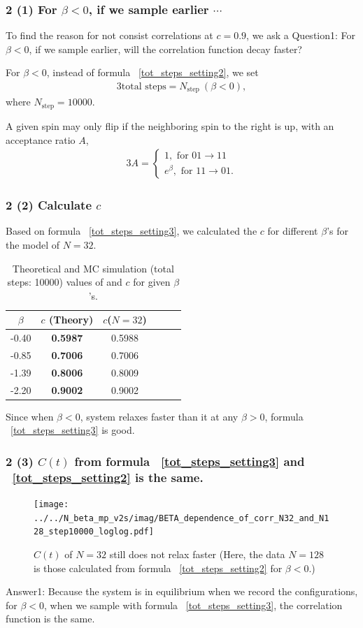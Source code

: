 \documentclass[8pt]{beamer}
\begin{document}
\begin{frame}
	\frametitle{2 (1) For $\beta < 0$, if we sample earlier $\cdots$}
	To find the reason for not consist correlations at $c=0.9$, we ask a Question1:
	For $\beta < 0$, if we sample earlier, will the correlation function decay faster? 
	
	For $\beta < 0$,
	instead of formula ~\ref{tot_steps_setting2}, we set 
	\begin{alignat}{3}
		\text{total steps} = N_\text{step} \   (\beta < 0)\label{tot_steps_setting3},
	\end{alignat}
	where $N_\text{step}=10000$.
	
	A given spin may only flip if the neighboring spin to the right is up, with an acceptance ratio $A$,
	\begin{alignat}{3}
		A = \left\{
		\begin{aligned}
			1, \text{ for } 01 \to 11 \\
			e^{\beta}, \text{ for } 11 \to 01.
		\end{aligned}
		\right
		.\nonumber
	\end{alignat}
\end{frame}
\begin{frame}
	\frametitle{2 (2) Calculate $c$}
	Based on formula ~\ref{tot_steps_setting3}, we calculated the $c$ for different $\beta$'s for the model of $N=32$.
	\begin{table}[htbp]
		\centering
		\caption{\label{tab:table_lino3} Theoretical and MC simulation (total steps: 10000) values of and $c$ for given $\beta$'s.}
		\begin{tabular}{cccccc}
			$\beta$ & $c$ (Theory) & $c$($N=32$) \\
			\hline
			-0.40 & \textbf{0.5987} & 0.5988  \\
			-0.85 & \textbf{0.7006} &  0.7006 \\
			-1.39 & \textbf{0.8006} & 0.8009  \\
			-2.20 & \textbf{0.9002} & 0.9002 
		\end{tabular}
	\end{table}
Since when $\beta<0$, system relaxes faster than it at any $\beta >0$, formula ~\ref{tot_steps_setting3} is good. 
\end{frame}


\begin{frame}
	\frametitle{2 (3) $C(t)$ from formula ~\ref{tot_steps_setting3} and ~\ref{tot_steps_setting2} is the same.}
	\begin{figure}
		\centering
		\texttt{[image: ../../N\_beta\_mp\_v2s/imag/BETA\_dependence\_of\_corr\_N32\_and\_N128\_step10000\_loglog.pdf]}
		\setlength{\abovecaptionskip}{0pt}
		\caption{$C(t)$ of $N=32$ still does not relax faster  (Here, the data $N=128$ is those calculated from formula ~\ref{tot_steps_setting2} for $\beta <0$.) }
	\end{figure}
Answer1:
Because the system is in equilibrium when we record the configurations, for $\beta < 0$, when we sample with formula ~\ref{tot_steps_setting3}, the correlation function is the same. 
\end{frame}
\end{document}
